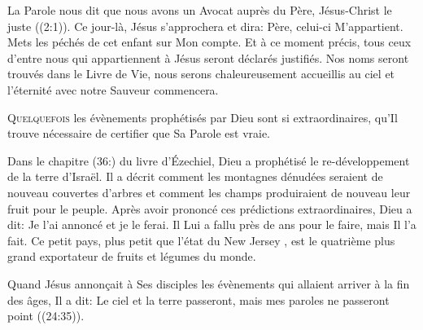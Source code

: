 
La Parole nous dit que \Og nous
 avons un Avocat auprès du Père, Jésus-Christ le juste \Fg{}
 ((2:1)).
 Ce jour-là, Jésus s'approchera et dira: 
 \Og Père, celui-ci M'appartient. Mets les péchés de cet enfant
 sur Mon compte. \Fg{}
 Et à ce moment précis, tous ceux d'entre nous qui appartiennent à Jésus
 seront déclarés justifiés. Nos noms seront trouvés dans le Livre de Vie,
 nous serons chaleureusement accueillis au ciel et l'éternité
 avec notre Sauveur commencera. 

\dvrule







\lettrine{Q}{uelquefois} les évènements prophétisés par Dieu
 sont si extraordinaires, qu'Il trouve nécessaire de certifier
 que Sa Parole est vraie. 

Dans le chapitre (36:) du livre d'Ézechiel, Dieu a prophétisé
 le re-développement de la terre d'Israël.
 Il a décrit comment les montagnes dénudées seraient de nouveau couvertes
 d'arbres et comment les 
 champs produiraient de nouveau leur fruit pour le peuple.
 Après avoir prononcé ces prédictions extraordinaires,
 Dieu a dit: 
 \Og Je l'ai annoncé et je le ferai. \Fg{}
 Il Lui a fallu près de  ans pour le faire, mais Il l'a fait.
 Ce petit pays, plus petit que l'état du New Jersey ,
 est le quatrième plus grand exportateur de fruits et légumes du monde. 


Quand Jésus annon\c{c}ait à Ses disciples les évènements
 qui allaient arriver à la fin des âges, Il a dit: 
 \Og Le ciel et la terre passeront, mais mes paroles ne passeront point \Fg{}
 ((24:35)). 

